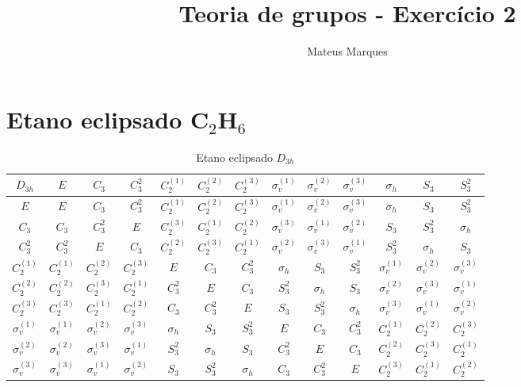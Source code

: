 \documentclass[a4paper,10pt]{article}
\title{\Huge{\textbf{Teoria de grupos - Exercício 2}}}
\author{Mateus Marques}
\begin{document}
\maketitle

\section*{Etano eclipsado C$_2$H$_6$}

\begin{table}[ht]
\caption{Etano eclipsado $D_{3h}$}
\centering

\begin{tabular} { |c|c c c c c c c c c c c c | }
\hline
$D_{3h}$ & $E$ & $C_3$ & $C_3^2$ & $C_2^{(1)}$ & $C_2^{(2)}$ & $C_2^{(3)}$ & $\sigma_v^{(1)}$ & $\sigma_v^{(2)}$ & $\sigma_v^{(3)}$ & $\sigma_h$ & $S_3$ & $S_3^2$ \\
\hline
$E$ & $E$ & $C_3$ & $C_3^2$ & $C_2^{(1)}$ & $C_2^{(2)}$ & $C_2^{(3)}$ & $\sigma_v^{(1)}$ & $\sigma_v^{(2)}$ & $\sigma_v^{(3)}$ & $\sigma_h$ & $S_3$ & $S_3^2$ \\
$C_3$ & $C_3$ & $C_3^2$ & $E$ & $C_2^{(3)}$ & $C_2^{(1)}$ & $C_2^{(2)}$ & $\sigma_v^{(3)}$ & $\sigma_v^{(1)}$ & $\sigma_v^{(2)}$ & $S_3$ & $S_3^2$ & $\sigma_h$ \\
$C_3^2$ & $C_3^2$ & $E$ & $C_3$ & $C_2^{(2)}$ & $C_2^{(3)}$ & $C_2^{(1)}$ & $\sigma_v^{(2)}$ & $\sigma_v^{(3)}$ & $\sigma_v^{(1)}$ & $S_3^2$ & $\sigma_h$ & $S_3$ \\
$C_2^{(1)}$ & $C_2^{(1)}$ & $C_2^{(2)}$ & $C_2^{(3)}$ & $E$ & $C_3$ & $C_3^2$ & $\sigma_h$ & $S_3$ & $S_3^2$ & $\sigma_v^{(1)}$ & $\sigma_v^{(2)}$ & $\sigma_v^{(3)}$ \\
$C_2^{(2)}$ & $C_2^{(2)}$ & $C_2^{(3)}$ & $C_2^{(1)}$ & $C_3^2$ & $E$ & $C_3$ & $S_3^2$ & $\sigma_h$ & $S_3$ & $\sigma_v^{(2)}$ & $\sigma_v^{(3)}$ & $\sigma_v^{(1)}$ \\
$C_2^{(3)}$ & $C_2^{(3)}$ & $C_2^{(1)}$ & $C_2^{(2)}$ & $C_3$ & $C_3^2$ & $E$ & $S_3$ & $S_3^2$ & $\sigma_h$ & $\sigma_v^{(3)}$ & $\sigma_v^{(1)}$ & $\sigma_v^{(2)}$ \\
$\sigma_v^{(1)}$ & $\sigma_v^{(1)}$ & $\sigma_v^{(2)}$ & $\sigma_v^{(3)}$ & $\sigma_h$ & $S_3$ & $S_3^2$ & $E$ & $C_3$ & $C_3^2$ & $C_2^{(1)}$ & $C_2^{(2)}$ & $C_2^{(3)}$ \\
$\sigma_v^{(2)}$ & $\sigma_v^{(2)}$ & $\sigma_v^{(3)}$ & $\sigma_v^{(1)}$ & $S_3^2$ & $\sigma_h$ & $S_3$ & $C_3^2$ & $E$ & $C_3$ & $C_2^{(2)}$ & $C_2^{(3)}$ & $C_2^{(1)}$ \\
$\sigma_v^{(3)}$ & $\sigma_v^{(3)}$ & $\sigma_v^{(1)}$ & $\sigma_v^{(2)}$ & $S_3$ & $S_3^2$ & $\sigma_h$ & $C_3$ & $C_3^2$ & $E$ & $C_2^{(3)}$ & $C_2^{(1)}$ & $C_2^{(2)}$ \\

\end{tabular}
\end{table}
\end{document}
